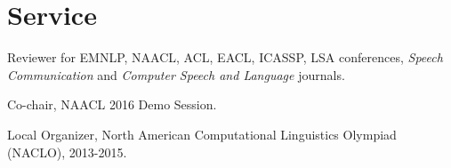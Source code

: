 \documentclass[10.5pt,letterpaper]{article}
\begin{document}
\section*{Service}

\begin{itemize*}

\item  Reviewer for EMNLP, NAACL, ACL, EACL, ICASSP, LSA conferences, {\em Speech Communication} and {\em Computer Speech and Language} journals.

\item Co-chair, NAACL 2016 Demo Session.

\item Local Organizer, North American Computational Linguistics Olympiad (NACLO), 2013-2015. 

\end{itemize*}




\end{document}
